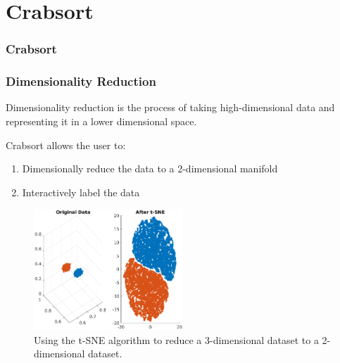 \documentclass{beamer}
\begin{document}

\section{Crabsort}

\begin{frame}
  \frametitle{Crabsort}
\end{frame}


\begin{frame}
  \frametitle{Dimensionality Reduction}

  Dimensionality reduction is the process of taking high-dimensional data
  and representing it in a lower dimensional space.

  Crabsort allows the user to:

  \begin{enumerate}
    \item Dimensionally reduce the data to a 2-dimensional manifold
    \item Interactively label the data
  \end{enumerate}

  \begin{figure}
    \includegraphics[width=0.5\textwidth]{gfx/t-SNE-example.eps}
    \centering
    \caption{Using the t-SNE algorithm to reduce a 3-dimensional dataset to a 2-dimensional dataset.}
    \label{fig:dimredexample}
  \end{figure}


\end{frame}

\end{document}
